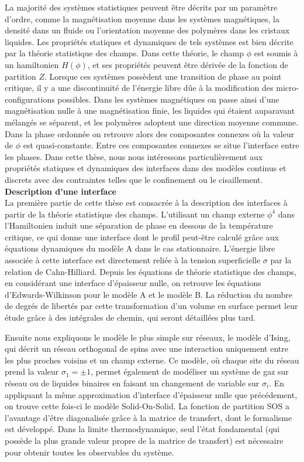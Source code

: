 La majorité des systèmes statistiques peuvent être décrits par un paramètre d'ordre, comme la magnétisation moyenne dans les systèmes magnétiques, la densité dans un fluide ou l'orientation moyenne des polymères dans les cristaux liquides. Les propriétés statiques et dynamiques de tels systèmes est bien décrite par la théorie statistique des champs. Dans cette théorie, le champ $\phi$ est soumis à un hamiltonien $H(\phi)$, et ses propriétés peuvent être dérivée de la fonction de partition $Z$.
Lorsque ces systèmes possèdent une transition de phase au point critique, il y a une discontinuité de l'énergie libre dûe à la modification des micro-configurations possibles. 
Dans les systèmes magnétiques on passe ainsi d'une magnétisation nulle à une magnétisation finie, les liquides qui étaient auparavant mélangés se séparent, et les polymères adoptent une direction moyenne commune. Dans la phase ordonnée on retrouve alors des composantes connexes où la valeur de $\phi$ est quasi-constante. Entre ces composantes connexes se situe l'interface entre les phases. 
Dans cette thèse, nous nous intéressons particulièrement aux propriétés statiques et dynamiques des interfaces dans des modèles continus et discrets avec des contraintes telles que le confinement ou le cisaillement. \\


{\bf \large Description d'une interface} \\

La première partie de cette thèse est consacrée à la description des interfaces à partir de la théorie statistique des champs. L'utilisant un champ externe $\phi^4$ dans l'Hamiltonien induit une séparation de phase en dessous de la température critique, ce qui donne une interface dont le profil peut-être calculé grâce aux équations dynamiques du modèle A dans le cas stationnaire. L'énergie libre associée à cette interface est directement reliée à la tension superficielle $\sigma$ par la relation de Cahn-Hilliard.
Depuis les équations de théorie statistique des champs, en considérant une interface d'épaisseur nulle, on retrouve les équations d'Edwards-Wilkinson pour le modèle A et le modèle B. La réduction du nombre de degrés de libertés par cette transformation d'un volume en surface permet leur étude grâce à des intégrales de chemin, qui seront détaillées plus tard.

Ensuite nous expliquons le modèle le plus simple sur réseaux, le modèle d'Ising, qui décrit un réseau orthogonal de spins avec une interaction uniquement entre les plus proches voisins et un champ externe. Ce modèle, où chaque site du réseau prend la valeur $\sigma_1 = \pm1$, permet également de modéliser un système de gaz sur réseau ou de liquides binaires en faisant un changement de variable sur $\sigma_i$. En appliquant la même approximation d'interface d'épaisseur nulle que précédement, on trouve cette fois-ci le modèle Solid-On-Solid. La fonction de partition SOS a l'avantage d'être diagonalisée grâce à la matrice de transfert, dont le formalisme est développé. Dans la limite thermodynamique, seul l'état fondamental (qui possède la plus grande valeur propre de la matrice de transfert) est nécessaire pour obtenir toutes les observables du système. 

